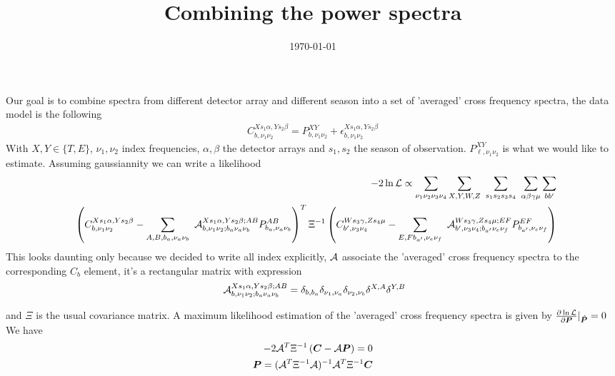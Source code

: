 \documentclass[prd]{revtex4}
\newcommand{\ba}{\begin{eqnarray}}
\newcommand{\ea}{\end{eqnarray}}
\begin{document}
\title{Combining the power spectra }

  \date{\today}
  \maketitle

Our goal is to combine spectra from different detector array and different season into a set of 'averaged' cross frequency spectra, the data model is the following
\ba
C_{b, \nu_{1} \nu_{2}}^{Xs_{1} \alpha , Y s_{2}  \beta } = P_{b,   \nu_{1}  \nu_{2}}^{XY} + \epsilon_{b, \nu_{1} \nu_{2}}^{Xs_{1} \alpha , Y s_{2}  \beta }
\ea
With $X,Y \in \{T,E\}$, $\nu_{1} ,\nu_{2}$ index frequencies,  $\alpha, \beta$ the detector arrays and $s_{1}, s_{2}$ the season of observation.
$P_{\ell,   \nu_{1}  \nu_{2}}^{XY} $ is what we would like to estimate. Assuming gaussiannity we can write a likelihood
\ba
-2 \ln {\cal L} \propto  \sum_{ \nu_{1} \nu_{2} \nu_{3} \nu_{4}} \sum_{ X, Y, W, Z} \sum_{ s_{1}s_{2}s_{3}s_{4}} \sum_{ \alpha \beta \gamma \mu} \sum_{bb'} \nonumber \\
  \left( C_{b, \nu_{1} \nu_{2}}^{Xs_{1} \alpha , Y s_{2}  \beta }  - \sum_{A, B, b_{a}, \nu_{a} \nu_{b}}  {\cal A}_{b,   \nu_{1}  \nu_{2}; b_{a} \nu_{a} \nu_{b}}^{Xs_{1} \alpha , Y s_{2}  \beta ; AB}  P_{b_{a},   \nu_{a}  \nu_{b}}^{AB} \right)^{T} \Xi^{-1}  \left( C_{b', \nu_{3} \nu_{4}}^{Ws_{3} \gamma , Z s_{4}  \mu }  - \sum_{E, F b_{a'}, \nu_{e} \nu_{f}}  {\cal A}_{b',   \nu_{3}  \nu_{4}; b_{a'} \nu_{e} \nu_{f}}^{Ws_{3} \gamma , Z s_{4}  \mu ; EF}  P_{b_{a'},   \nu_{e}  \nu_{f}}^{EF}\right)
\ea
This looks daunting only because we decided to write all index explicitly,  $ {\cal A}  $ associate the 'averaged' cross frequency spectra to the corresponding $ C_{b}$ element, it's a rectangular matrix with expression
\ba
  {\cal A}_{b,   \nu_{1}  \nu_{2}; b_{a} \nu_{a} \nu_{b}}^{Xs_{1} \alpha , Y s_{2}  \beta ; AB}   = \delta_{b, b_{a}}  \delta_{ \nu_{1}, \nu_{a}} \delta_{ \nu_{2}, \nu_{b}}   \delta^{X, A} \delta^{Y, B} 
\ea

and $\Xi$ is the usual covariance matrix. A maximum likelihood estimation of the  'averaged' cross frequency spectra is given by
$\frac{ \partial \ln {\cal L}}{\partial \bm{P}} |_{\hat{\bm{P}}}= 0$
We have
\ba
 - 2 {\cal A}^{T} \Xi^{-1}  \left( \bm{C}- {\cal A}   \bm{P} \right) = 0 \\
  \bm{P}  =   ({\cal A}^{T} \Xi^{-1} {\cal A} )^{-1} {\cal A}^{T} \Xi^{-1}  \bm{C}
\ea
\end{document}
